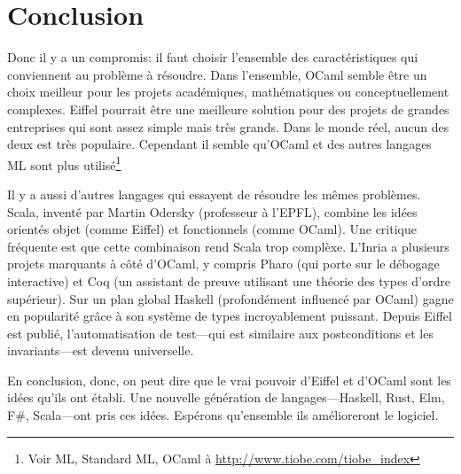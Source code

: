 \documentclass[french]{report}
\begin{document}
\chapter{Conclusion}

Donc il y a un compromis: il faut choisir l'ensemble des caractéristiques qui conviennent au problème à résoudre. Dans l'ensemble, OCaml semble être un choix meilleur pour les projets académiques, mathématiques ou conceptuellement complexes. Eiffel pourrait être une meilleure solution pour des projets de grandes entreprises qui sont assez simple mais très grands. Dans le monde réel, aucun des deux est très populaire. Cependant il semble qu'OCaml et des autres langages ML sont plus utilisé\footnote{Voir ML, Standard ML, OCaml à \url{http://www.tiobe.com/tiobe_index}}

Il y a aussi d'autres langages qui essayent de résoudre les mêmes problèmes. Scala, inventé par Martin Odersky (professeur à l'EPFL), combine les idées orientés objet (comme Eiffel) et fonctionnels (comme OCaml). Une critique fréquente est que cette combinaison rend Scala trop complèxe. L'Inria a plusieurs projets marquants à côté d'OCaml, y compris Pharo (qui porte sur le débogage interactive) et Coq (un assistant de preuve utilisant une théorie des types d'ordre supérieur). Sur un plan global Haskell (profondément influencé par OCaml) gagne en popularité grâce à son système de types incroyablement puissant. Depuis Eiffel est publié, l'automatisation de test---qui est similaire aux postconditions et les invariants---est devenu universelle.

En conclusion, donc, on peut dire que le vrai pouvoir d'Eiffel et d'OCaml sont les idées qu'ils ont établi. Une nouvelle génération de langages---Haskell, Rust, Elm, F#, Scala---ont pris ces idées. Espérons qu'ensemble ils amélioreront le logiciel.
\end{document}
